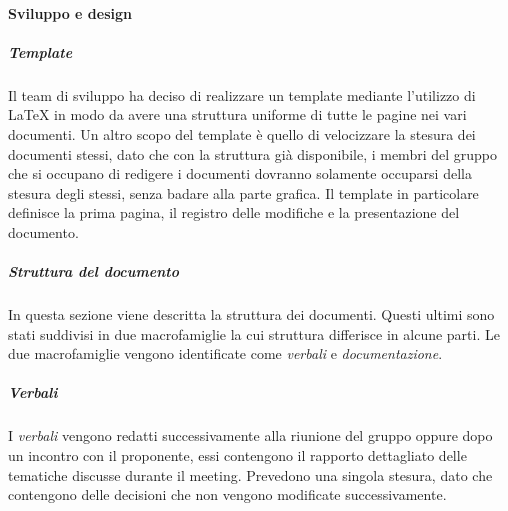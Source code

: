 \paragraph{Sviluppo e design}\label{paragraph:sviluppo_design}
\subparagraph{Template}
Il team di sviluppo ha deciso di realizzare un template mediante l'utilizzo di \LaTeX{} in modo da avere una struttura uniforme di tutte le pagine nei vari documenti.
Un altro scopo del template è quello di velocizzare la stesura dei documenti stessi, dato che con la struttura già disponibile, i membri del gruppo che si occupano di redigere i documenti dovranno solamente occuparsi della stesura degli stessi, senza badare alla parte grafica.
Il template in particolare definisce la prima pagina, il registro delle modifiche e la presentazione del documento.
\subparagraph{Struttura del documento}
In questa sezione viene descritta la struttura dei documenti. Questi ultimi sono stati suddivisi in due macrofamiglie la cui struttura differisce in alcune parti. Le due macrofamiglie vengono identificate come \textit{verbali} e \textit{documentazione}.
\subparagraph{\textit{Verbali}}
I \textit{verbali} vengono redatti successivamente alla riunione del gruppo oppure dopo un incontro con il proponente, essi contengono il rapporto dettagliato delle tematiche discusse durante il meeting.
Prevedono una singola stesura, dato che contengono delle decisioni che non vengono modificate successivamente.

